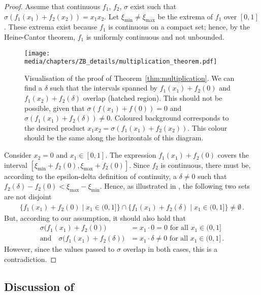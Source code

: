 \begin{proof}
Assume that continuous $f_1$, $f_2$, $\sigma$ exist such that $\sigma(f_1(x_1) + f_2(x_2)) = x_1 x_2$.
Let $\xi_\mathrm{min} \neq \xi_\mathrm{max}$ be the extrema of $f_1$ over $[0, 1]$.
These extrema exist because $f_1$ is continuous on a compact set; hence, by the Heine-Cantor theorem, $f_1$ is uniformly continuous and not unbounded.


\begin{figure}[t]
	\centering
	\texttt{[image: media/chapters/ZB\_details/multiplication\_theorem.pdf]}
	\caption[Visualisation of the proof of Theorem~\ref{thm:multiplication}]{Visualisation of the proof of Theorem~\ref{thm:multiplication}.
	We can find a $\delta$ such that the intervals spanned by $f_1(x_1) + f_2(0)$ and $f_1(x_2) + f_2(\delta)$ overlap (hatched region).
	This should not be possible, given that $\sigma(f(x_1) + f(0)) = 0$ and $\sigma(f_1(x_1) + f_2(\delta)) \neq 0$.
	Coloured background corresponds to the desired product $x_1 x_2 = \sigma(f_1(x_1) + f_2(x_2))$.
	This colour should be the same along the horizontals of this diagram.}
	\label{fig:multiplication_theorem}
\end{figure}

Consider $x_2 = 0$ and $x_1 \in [0, 1]$.
The expression $f_1(x_1) + f_2(0)$ covers the interval $[\xi_\mathrm{min} + f_2(0) , \xi_\mathrm{max} + f_2(0)]$.
Since $f_2$ is continuous, there must be, according to the epsilon-delta definition of continuity, a $\delta \neq 0$ such that $f_2(\delta) - f_2(0) < \xi_\mathrm{max} - \xi_\mathrm{min}$.
Hence, as illustrated in , the following two sets are not disjoint
\begin{align*}
	\bigl\{ f_1(x_1) + f_2(0) \mid x_1 \in (0, 1] \bigr\} \cap \bigl\{ f_1(x_1) + f_2(\delta) \mid x_1 \in (0, 1] \bigr\} \neq \emptyset \,.
\end{align*}
But, according to our assumption, it should also hold that
\begin{align*}
	\sigma\bigl(f_1(x_1) + f_2(0)\bigr) &= x_1 \cdot 0 = 0 \text{ for all } x_1 \in (0, 1] \\
	\text{and} \quad \sigma\bigl(f_1(x_1) + f_2(\delta)\bigr) &= x_1 \cdot \delta \neq 0 \text{ for all } x_1 \in (0, 1] \,.
\end{align*}
However, since the values passed to $\sigma$ overlap in both cases, this is a contradiction. \Lightning
\end{proof}

\subsection{Discussion of }
\label{app:thm_two_layer_universal}

